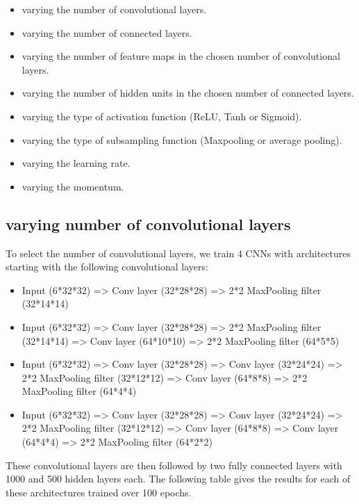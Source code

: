 \begin{itemize}
	\item varying the number of convolutional layers.
	\item varying the number of connected layers.
	\item varying the number of feature maps in the chosen number of convolutional layers.
	\item varying the number of hidden units in the chosen number of connected layers.
	\item varying the type of activation function (ReLU, Tanh or Sigmoid).
	\item varying the type of subsampling function (Maxpooling or average pooling).
	\item varying the learning rate.
	\item varying the momentum.
\end{itemize}

\subsection{varying number of convolutional layers}

To select the number of convolutional layers, we train 4 CNNs with architectures starting with the following convolutional layers:

\begin{itemize}
	\item Input (6*32*32) => Conv layer (32*28*28) => 2*2 MaxPooling filter (32*14*14) 
	\item Input (6*32*32) => Conv layer (32*28*28) => 2*2 MaxPooling filter (32*14*14) => Conv layer (64*10*10) => 2*2 MaxPooling filter (64*5*5)
	\item Input (6*32*32) => Conv layer (32*28*28) => Conv layer (32*24*24) => 2*2 MaxPooling filter (32*12*12) => Conv layer (64*8*8) => 2*2 MaxPooling filter (64*4*4)
	\item Input (6*32*32) => Conv layer (32*28*28) => Conv layer (32*24*24) => 2*2 MaxPooling filter (32*12*12) => Conv layer (64*8*8) => Conv layer (64*4*4) => 2*2 MaxPooling filter (64*2*2)
\end{itemize}

These convolutional layers are then followed by two fully connected layers with 1000 and 500 hidden layers each. The following table gives the results for each of these architectures trained over 100 epochs.\\

